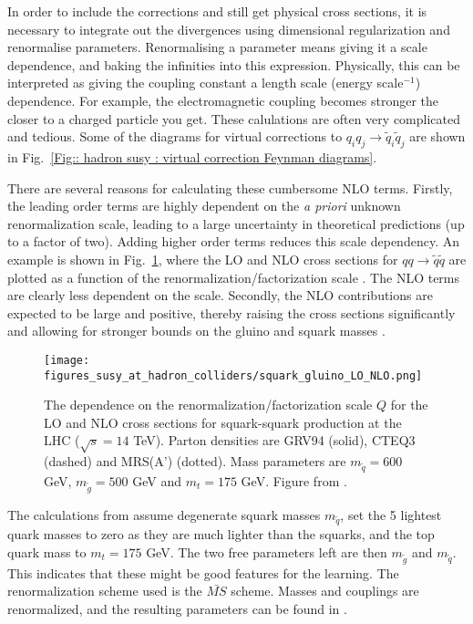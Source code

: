 \documentclass[twoside,english]{uiofysmaster}
\begin{document}
In order to include the corrections and still get physical cross sections, it is necessary to integrate out the divergences using dimensional regularization and renormalise parameters. Renormalising a parameter means giving it a scale dependence, and baking the infinities into this expression. Physically, this can be interpreted as giving the coupling constant a length scale (energy scale$^{-1}$) dependence. For example, the electromagnetic coupling becomes stronger the closer to a charged particle you get. These calulations are often very complicated and tedious. Some of the diagrams for virtual corrections to $q_iq_j \rightarrow \tilde{q}_i \tilde{q}_j$ are shown in Fig.~\ref{Fig:: hadron susy : virtual correction Feynman diagrams}.

There are several reasons for calculating these cumbersome NLO terms. Firstly, the leading order terms are highly dependent on the \textit{a priori} unknown renormalization scale, leading to a large uncertainty in theoretical predictions (up to a factor of two). Adding higher order terms reduces this scale dependency. An example is shown in Fig.~\ref{Fig:: hadron susy : LO vs NLO beenakker}, where the LO and NLO cross sections for $qq \rightarrow \tilde{q} \tilde{q}$ are plotted as a function of the renormalization/factorization scale \cite{beenakker1997squark}. The NLO terms are clearly less dependent on the scale.  Secondly, the NLO contributions are expected to be large and positive, thereby raising the cross sections significantly and allowing for stronger bounds on the gluino and squark masses \cite{beenakker1997squark}.

\begin{figure}
\centering
\texttt{[image: figures\_susy\_at\_hadron\_colliders/squark\_gluino\_LO\_NLO.png]}
\caption{The dependence on the renormalization/factorization scale $Q$ for the LO and NLO cross sections for squark-squark production at the LHC ($\sqrt{s}=14$ TeV). Parton densities are GRV94 (solid), CTEQ3 (dashed) and MRS(A') (dotted). Mass parameters are $m_{\tilde{q}}=600$ GeV, $m_{\tilde{g}}=500$ GeV and $m_t=175$ GeV. Figure from \cite{beenakker1997squark}.}
\label{Fig:: hadron susy : LO vs NLO beenakker}
\end{figure}


The calculations from \cite{beenakker1997squark} assume degenerate squark masses $m_{\tilde{q}}$, set the 5 lightest quark masses to zero as they are much lighter than the squarks, and the top quark mass to $m_t =175$ GeV. The two free parameters left are then $m_{\tilde{g}}$ and $m_{\tilde{q}}$. This indicates that these might be good features for the learning. The renormalization scheme used is the $\bar{MS}$ scheme. Masses and couplings are renormalized, and the resulting parameters can be found in \cite{beenakker1997squark}.
\end{document}
